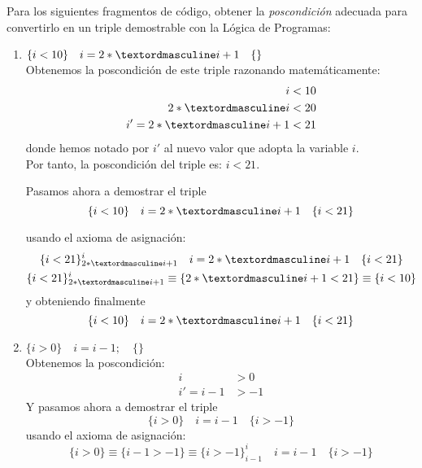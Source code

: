 \begin{ejercicio}
    Para los siguientes fragmentos de código, obtener la \emph{poscondición} adecuada para convertirlo en un triple demostrable con la Lógica de Programas:
    \begin{enumerate}
        \item $\{i < 10\} \quad i = 2 \astº i + 1 \quad \{ \}$\\
            Obtenemos la poscondición de este triple razonando matemáticamente:
            \begin{align*}
                i &< 10 \\
                2\astº i &< 20 \\
                i' = 2\astº i + 1 &< 21
            \end{align*}
            donde hemos notado por $i'$ al nuevo valor que adopta la variable $i$.\\

            Por tanto, la poscondición del triple es: $i < 21$.

            Pasamos ahora a demostrar el triple
            \begin{equation*}
               \{i < 10\} \quad i = 2 \astº i + 1 \quad \{i<21\}
            \end{equation*}
            
            usando el axioma de asignación:
            \begin{gather*}
                \{i<21\}^i_{2\astº i + 1}\quad i=2\astº i + 1\quad \{i<21\} \\
                \{i<21\}^i_{2\astº i + 1} \equiv \{2\astº i + 1 < 21\} \equiv \{i < 10\} 
            \end{gather*}
            y obteniendo finalmente
            \begin{equation*}
                \{i<10\}\quad i=2\astº i + 1\quad \{i<21\} \\
            \end{equation*}

        \item $\{i > 0\} \quad i = i - 1; \quad \{ \}$\\
            Obtenemos la poscondición:
            \begin{align*}
                i &> 0 \\
                i' = i-1 &> -1
            \end{align*}
            Y pasamos ahora a demostrar el triple
            \begin{equation*}
                \{i>0\} \quad i=i-1 \quad\{i>-1\}
            \end{equation*}
            usando el axioma de asignación:
            \begin{equation*}
                \{i>0\} \equiv \{i-1>-1\} \equiv \{i>-1\}^i_{i-1} \quad i=i-1 \quad\{i>-1\}
            \end{equation*}


\end{enumerate}
\end{ejercicio}
